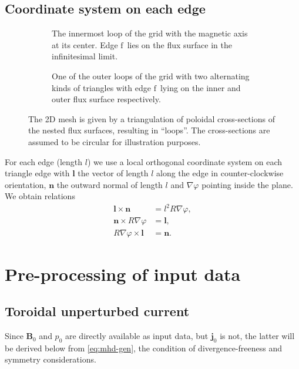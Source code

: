 \documentclass[a4paper, 10pt, english]{article}
\let\temp\varrho
\let\varrho\rho
\let\rho\temp
\let\temp\vartheta
\let\vartheta\theta
\let\theta\temp
\let\temp\varphi
\let\varphi\phi
\let\phi\temp
\let\vec\symbf
\newcommand*\fs{\ensuremath{\textrm{f}}}  %
\begin{document}
\subsection{Coordinate system on each edge}

\begin{figure}
  \centering
  \begin{subfigure}[b]{0.33\textwidth}
    \centering
    
    \caption{The innermost loop of the grid with the magnetic axis at its center. Edge \fs\ lies on the flux surface in the infinitesimal limit.}
    \label{fig:grid0}
  \end{subfigure}
  \quad
  \begin{subfigure}[b]{0.5\textwidth}
    \centering
    
    \caption{One of the outer loops of the grid with two alternating kinds of triangles with edge \fs\ lying on the inner and outer flux surface respectively.}
    \label{fig:grid1}
  \end{subfigure}
  \caption{The 2D mesh is given by a triangulation of poloidal cross-sections of the nested flux surfaces, resulting in \enquote{loops}. The cross-sections are assumed to be circular for illustration purposes.}
  \label{fig:grid}
\end{figure}

For each edge (length $l$) we use a local orthogonal coordinate system on each triangle edge with $\vec{l}$ the vector of length $l$ along the edge in counter-clockwise orientation, $\vec{n}$ the outward normal of length $l$ and $\nabla \phi$ pointing inside the plane. We obtain relations
\begin{align}
  \vec{l} \times \vec{n} &= l^{2} R \nabla \phi, \\
  \vec{n} \times R \nabla \phi &= \vec{l}, \\
  R \nabla \phi \times \vec{l} &= \vec{n}.
\end{align}

\section{Pre-processing of input data}

\subsection{Toroidal unperturbed current}

Since $\vec{B}_{0}$ and $p_{0}$ are directly available as input data, but $\vec{j}_{0}$ is not, the latter will be derived below from \cref{eq:mhd-gen}, the condition of divergence-freeness and symmetry considerations.
\end{document}
